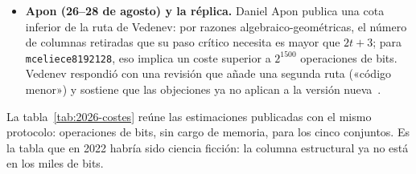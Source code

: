 \documentclass[11pt,a4paper,oneside]{report}
\begin{document}
\begin{itemize}[leftmargin=1.5em,itemsep=3pt]
        Stephen Weis, de Anthropic, mejora el ataque en dos frentes.
        Primero, el coste de una ejecución baja a $2^{89}$--$2^{98}$
        operaciones de bits (sin cargo de memoria); pagando cada
        operación por la memoria que direcciona, a coste de raíz
        cuadrada, $2^{107}$--$2^{117}$; bajo la regla contable de la
        guía de seguridad ---que carga el coste de toda la memoria
        en cada operación---, $2^{117}$--$2^{128}$, contra
        $2^{159}$--$2^{316}$ de la decodificación genérica en ese
        mismo modelo. Segundo, dos rutas de recuperación de clave:
        una apoyada en un teorema que demuestra y que exige entre
        100 y 1400 ejecuciones; otra, de una sola ejecución, que
        construye sobre el key recovery de GIJS. «Nada de esto está
        cerca de lo práctico ---escribe---, y una ejecución a tamaño
        completo no puede probarse»~\cite{weis2026}.
  \item \textbf{Apon (26--28 de agosto) y la réplica.} Daniel Apon
        publica una cota inferior de la ruta de Vedenev: por razones
        algebraico-geométricas, el número de columnas retiradas que
        su paso crítico necesita es mayor que $2t+3$; para
        \texttt{mceliece8192128}, eso implica un coste superior a
        $2^{1500}$ operaciones de bits. Vedenev respondió con una
        revisión que añade una segunda ruta
        («código menor») y sostiene que las objeciones ya no aplican
        a la versión nueva~\cite{apon2026,vedenev2026}.
\end{itemize}

La tabla~\ref{tab:2026-costes} reúne las estimaciones publicadas con
el mismo protocolo: operaciones de bits, sin cargo de memoria, para
los cinco conjuntos. Es la tabla que en 2022 habría sido ciencia
ficción: la columna estructural ya no está en los miles de bits.
\end{document}
